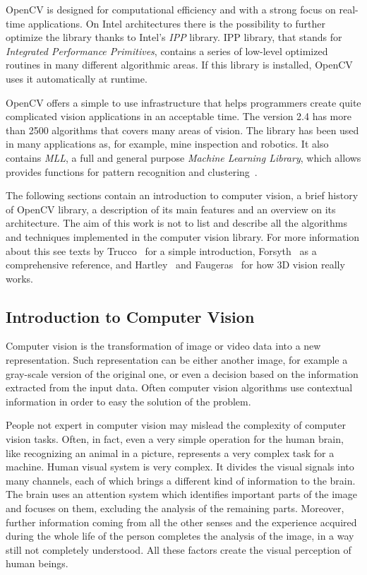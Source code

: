 	\mbox{OpenCV} is designed for computational efficiency and with a strong focus on real-time applications. On Intel architectures there is the possibility to further optimize the library thanks to Intel's \emph{IPP} library. IPP library, that stands for \emph{Integrated Performance Primitives}, contains a series of low-level optimized routines in many different algorithmic areas. If this library is installed, \mbox{OpenCV} uses it automatically at runtime.

	\mbox{OpenCV} offers a simple to use infrastructure that helps programmers create quite complicated vision applications in an acceptable time. The version 2.4 has more than 2500 algorithms that covers many areas of vision. The library has been used in many applications as, for example, mine inspection and robotics. 
	It also contains \emph{MLL}, a full and general purpose \emph{Machine Learning Library}, which allows provides functions for pattern recognition and clustering~\cite{bradski2008learning,OpenCV:MainWebPage}. 

	The following sections contain an introduction to computer vision, a brief history of OpenCV library, a description of its main features and an overview on its architecture. The aim of this work is not to list and describe all the algorithms and techniques implemented in the computer vision library. For more information about this see texts by Trucco~\cite{trucco1998introductory} for a simple introduction, Forsyth~\cite{forsyth2011computer} as a comprehensive reference, and Hartley~\cite{hartley2003multiple} and Faugeras~\cite{faugeras1993three} for how 3D vision really works.

	
	\subsection{Introduction to Computer Vision}
	Computer vision is the transformation of image or video data into a new representation. Such representation can be either another image, for example a gray-scale version of the original one, or even a decision based on the information extracted from the input data. 
	Often computer vision algorithms use contextual information in order to easy the solution of the problem.

	People not expert in computer vision may mislead the complexity of computer vision tasks. Often, in fact, even a very simple operation for the human brain, like recognizing an animal in a picture, represents a very complex task for a machine. 
	Human visual system is very complex. It divides the visual signals into many channels, each of which brings a different kind of information to the brain. The brain uses an attention system which identifies important parts of the image and focuses on them, excluding the analysis of the remaining parts. Moreover, further information coming from all the other senses and the experience acquired during the whole life of the person completes the analysis of the image, in a way still not completely understood. All these factors create the visual perception of human beings.

